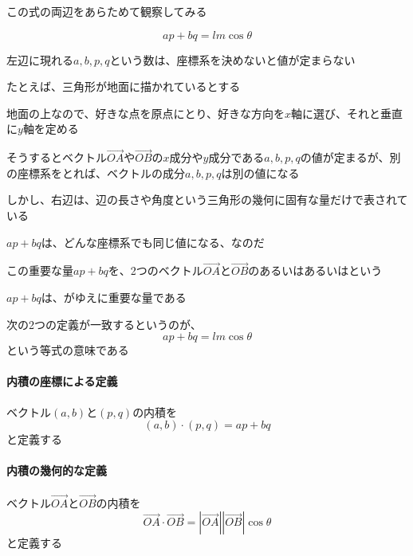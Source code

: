 \documentclass[../book_jiriki_calc]{subfiles}
\begin{document}
\sectionline

この式の両辺をあらためて観察してみる

\begin{equation*}
  ap + bq = lm\cos\theta
\end{equation*}

左辺に現れる$a, b, p, q$という数は、座標系を決めないと値が定まらない

たとえば、三角形が地面に描かれているとする

地面の上なので、好きな点を原点にとり、好きな方向を$x$軸に選び、それと垂直に$y$軸を定める

そうするとベクトル$\overrightarrow{OA}$や$\overrightarrow{OB}$の$x$成分や$y$成分である$a, b, p, q$の値が定まるが、別の座標系をとれば、ベクトルの成分$a, b, p, q$は別の値になる

\br

しかし、右辺は、辺の長さや角度という三角形の幾何に固有な量だけで表されている

$ap+bq$は、どんな座標系でも同じ値になる、なのだ

\br

この重要な量$ap+bq$を、2つのベクトル$\overrightarrow{OA}$と$\overrightarrow{OB}$のあるいはあるいはという

$ap+bq$は、がゆえに重要な量である

\sectionline

次の2つの定義が一致するというのが、
\begin{equation*}
  ap + bq = lm\cos\theta
\end{equation*}
という等式の意味である

\br

\paragraph{内積の座標による定義}\quad

ベクトル$(a,b)$と$(p,q)$の内積を
\begin{equation*}
  (a,b)\cdot(p,q) = ap + bq
\end{equation*}
と定義する

\br

\paragraph{内積の幾何的な定義}\quad

ベクトル$\overrightarrow{OA}$と$\overrightarrow{OB}$の内積を
\begin{equation*}
  \overrightarrow{OA}\cdot\overrightarrow{OB} = |\overrightarrow{OA}||\overrightarrow{OB}|\cos\theta
\end{equation*}
と定義する
\end{document}
